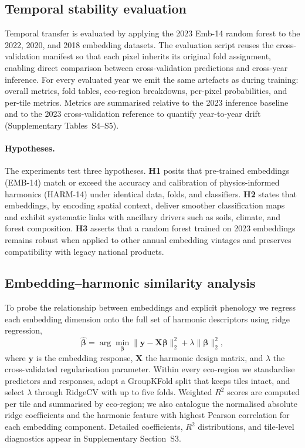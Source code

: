 \documentclass[utf8]{FrontiersinHarvard}
\begin{document}
\subsection{Temporal stability evaluation}
Temporal transfer is evaluated by applying the 2023 Emb-14 random forest to the 2022, 2020, and 2018 embedding datasets. The evaluation script reuses the cross-validation manifest so that each pixel inherits its original fold assignment, enabling direct comparison between cross-validation predictions and cross-year inference. For every evaluated year we emit the same artefacts as during training: overall metrics, fold tables, eco-region breakdowns, per-pixel probabilities, and per-tile metrics. Metrics are summarised relative to the 2023 inference baseline and to the 2023 cross-validation reference to quantify year-to-year drift (Supplementary Tables~S4–S5).

\paragraph{Hypotheses.} The experiments test three hypotheses. \textbf{H1} posits that pre-trained embeddings (EMB-14) match or exceed the accuracy and calibration of physics-informed harmonics (HARM-14) under identical data, folds, and classifiers. \textbf{H2} states that embeddings, by encoding spatial context, deliver smoother classification maps and exhibit systematic links with ancillary drivers such as soils, climate, and forest composition. \textbf{H3} asserts that a random forest trained on 2023 embeddings remains robust when applied to other annual embedding vintages and preserves compatibility with legacy national products.

\subsection{Embedding–harmonic similarity analysis}
To probe the relationship between embeddings and explicit phenology we regress each embedding dimension onto the full set of harmonic descriptors using ridge regression,
\begin{equation*}
    \hat{\boldsymbol{\beta}} = \arg\min_{\boldsymbol{\beta}} \big\| \mathbf{y} - \mathbf{X}\boldsymbol{\beta} \big\|_2^2 + \lambda \|\boldsymbol{\beta}\|_2^2,
\end{equation*}
where \(\mathbf{y}\) is the embedding response, \(\mathbf{X}\) the harmonic design matrix, and \(\lambda\) the cross-validated regularisation parameter. Within every eco-region we standardise predictors and responses, adopt a GroupKFold split that keeps tiles intact, and select \(\lambda\) through RidgeCV with up to five folds. Weighted $R^2$ scores are computed per tile and summarised by eco-region; we also catalogue the normalised absolute ridge coefficients and the harmonic feature with highest Pearson correlation for each embedding component. Detailed coefficients, $R^2$ distributions, and tile-level diagnostics appear in Supplementary Section~S3.
\end{document}
